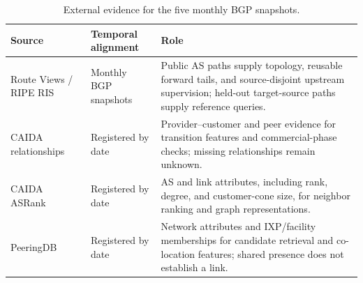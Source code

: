 \begin{table}[t]
\centering
\caption{External evidence for the five monthly BGP snapshots.}
\label{tab:data_sources}
\small
\setlength{\tabcolsep}{5pt}
\begin{tabularx}{\textwidth}{@{}p{3.2cm}p{2.2cm}X@{}}
\toprule
Source & Temporal alignment & Role\\
\midrule
Route Views / RIPE RIS~\cite{RouteViews,RIPERIS}
& Monthly BGP snapshots
& Public AS paths supply topology, reusable forward tails, and
source-disjoint upstream supervision; held-out target-source paths
supply reference queries.\\
CAIDA relationships~\cite{caidaASRelationships}
& Registered by date
& Provider--customer and peer evidence for transition features and
commercial-phase checks; missing relationships remain unknown.\\
CAIDA ASRank~\cite{caidaASrank}
& Registered by date
& AS and link attributes, including rank, degree, and customer-cone size,
for neighbor ranking and graph representations.\\
PeeringDB~\cite{PeeringDB}
& Registered by date
& Network attributes and IXP/facility memberships for candidate retrieval
and co-location features; shared presence does not establish a link.\\
\bottomrule
\end{tabularx}
\end{table}
